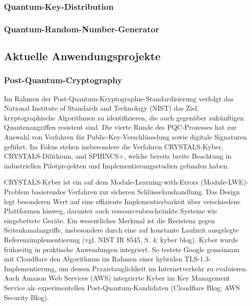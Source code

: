 \subsubsection{Quantum-Key-Distribution}
\subsubsection{Quantum-Random-Number-Generator}

\subsection{Aktuelle Anwendungsprojekte}
\subsubsection{Post-Quantum-Cryptography}
\cite{}
Im Rahmen der Post-Quantum-Kryptographie-Standardisierung verfolgt das National Institute of Standards and Technology (NIST) das Ziel, kryptographische Algorithmen zu identifizieren, die auch gegenüber zukünftigen Quantenangriffen resistent sind. Die vierte Runde des PQC-Prozesses hat zur Auswahl von Verfahren für Public-Key-Verschlüsselung sowie digitale Signaturen geführt. Im Fokus stehen insbesondere die Verfahren CRYSTALS-Kyber, CRYSTALS-Dilithium, and SPHINCS+, welche bereits breite Beachtung in industriellen Pilotprojekten und Implementierungsstudien gefunden haben.

CRYSTALS-Kyber ist ein auf dem Module-Learning-with-Errors (Module-LWE)-Problem basierendes Verfahren zur sicheren Schlüsselaushandlung. Das Design legt besonderen Wert auf eine effiziente Implementierbarkeit über verschiedene Plattformen hinweg, darunter auch ressourcenbeschränkte Systeme wie eingebettete Geräte. Ein wesentliches Merkmal ist die Resistenz gegen Seitenkanalangriffe, insbesondere durch eine auf konstante Laufzeit ausgelegte Referenzimplementierung (vgl. NIST IR 8545, S. 4; kyber blog). Kyber wurde frühzeitig in praktische Anwendungen integriert. So testete Google gemeinsam mit Cloudflare den Algorithmus im Rahmen einer hybriden TLS-1.3-Implementierung, um dessen Praxistauglichkeit im Internetverkehr zu evaluieren. Auch Amazon Web Services (AWS) integrierte Kyber im Key Management Service als experimentellen Post-Quantum-Kandidaten (Cloudflare Blog; AWS Security Blog).

